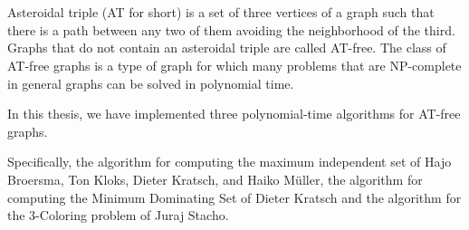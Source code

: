 \chapter*{\csebilabstract}
\addstarredchapter{\csebilabstract} %
\makecsebilabstract

\noindent Asteroidal triple (AT for short) is a set of three vertices of a graph such that there is a path between any two of them avoiding the neighborhood of the third. Graphs that do not contain an asteroidal triple are called AT-free. The class of AT-free graphs is a type of graph for which many problems that are NP-complete in general graphs can be solved in polynomial time.

In this thesis, we have implemented three polynomial-time algorithms for AT-free graphs.

Specifically, the algorithm for computing the maximum independent set of Hajo Broersma, Ton Kloks, Dieter Kratsch, and Haiko Müller\cite{at-free-independent-sets}, the algorithm for computing the Minimum Dominating Set of Dieter Kratsch\cite{at-free-independent-sets} and the algorithm for the 3-Coloring problem of Juraj Stacho\cite{at-free-3-colouring}. 